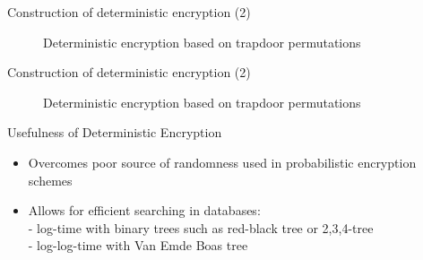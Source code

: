 \documentclass{beamer}
\begin{document}
\begin{frame}{Construction of deterministic encryption (2)}
\begin{figure}
	\begin{pchstack}[center]
		
		\pchspace
		
	\end{pchstack}
	
	\caption{Deterministic encryption based on trapdoor permutations}
	

\end{figure}
\end{frame}


\begin{frame}{Construction of deterministic encryption (2)}
\begin{figure}
	\begin{pchstack}[center]
	\end{pchstack}

	\caption{Deterministic encryption based on trapdoor permutations}
\end{figure}
\end{frame}


\begin{frame}{Usefulness of Deterministic Encryption}
\begin{itemize}
\item Overcomes poor source of randomness used in probabilistic encryption schemes
\item Allows for efficient searching in databases: \\
- log-time with binary trees such as red-black tree or 2,3,4-tree  \\
- log-log-time with Van Emde Boas tree
\end{itemize}	
\end{frame}
\end{document}
